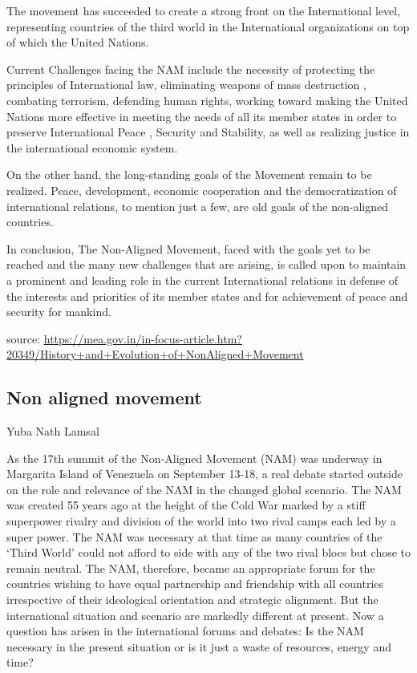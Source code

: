 \documentclass[
  openany]{book}
\begin{document}
The movement has succeeded to create a strong front on the International level, representing countries of the third world in the International organizations on top of which the United Nations.

Current Challenges facing the NAM include the necessity of protecting the principles of International law, eliminating weapons of mass destruction , combating terrorism, defending human rights, working toward making the United Nations more effective in meeting the needs of all its member states in order to preserve International Peace , Security and Stability, as well as realizing justice in the international economic system.

On the other hand, the long-standing goals of the Movement remain to be realized. Peace, development, economic cooperation and the democratization of international relations, to mention just a few, are old goals of the non-aligned countries.

In conclusion, The Non-Aligned Movement, faced with the goals yet to be reached and the many new challenges that are arising, is called upon to maintain a prominent and leading role in the current International relations in defense of the interests and priorities of its member states and for achievement of peace and security for mankind.

source: \url{https://mea.gov.in/in-focus-article.htm?20349/History+and+Evolution+of+NonAligned+Movement}

\hypertarget{non-aligned-movement}{%
\subsection{Non aligned movement}\label{non-aligned-movement}}

Yuba Nath Lamsal

As the 17th summit of the Non-Aligned Movement (NAM) was underway in Margarita Island of Venezuela on September 13-18, a real debate started outside on the role and relevance of the NAM in the changed global scenario. The NAM was created 55 years ago at the height of the Cold War marked by a stiff superpower rivalry and division of the world into two rival camps each led by a super power. The NAM was necessary at that time as many countries of the `Third World' could not afford to side with any of the two rival blocs but chose to remain neutral. The NAM, therefore, became an appropriate forum for the countries wishing to have equal partnership and friendship with all countries irrespective of their ideological orientation and strategic alignment. But the international situation and scenario are markedly different at present. Now a question has arisen in the international forums and debates: Is the NAM necessary in the present situation or is it just a waste of resources, energy and time?
\end{document}
